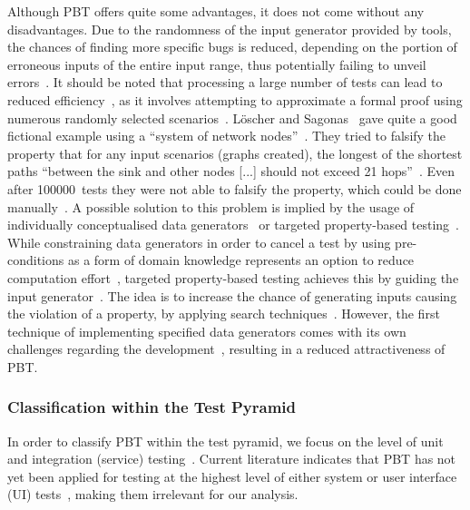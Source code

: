 \documentclass[runningheads]{llncs}
\begin{document}
Although PBT offers quite some advantages, it does not come without any disadvantages. Due to the randomness of the input generator provided by tools, the chances of finding more specific bugs is reduced, depending on the portion of erroneous inputs of the entire input range, thus potentially failing to unveil errors~\cite{Loescher2017,Padhye2019,ElazarMittelman2023,Shi2023}. It should be noted that processing a large number of tests can lead to reduced efficiency~\cite{ElazarMittelman2023,Shi2023}, as it involves attempting to approximate a formal proof using numerous randomly selected scenarios~\cite{Fink1997,ElazarMittelman2023,Paraskevopoulou2015}. Löscher and Sagonas~\cite{Loescher2017} gave quite a good fictional example using a ``system of network nodes''~\cite{Loescher2017}. They tried to falsify the property that for any input scenarios (graphs created), the longest of the shortest paths ``between the sink and other nodes [...] should not exceed 21 hops''~\cite{Loescher2017}. Even after 100000~tests they were not able to falsify the property, which could be done manually~\cite{Loescher2017}. A possible solution to this problem is implied by the usage of individually conceptualised data generators~\cite{Loescher2017,ElazarMittelman2023,Shi2023,Paraskevopoulou2015,Claessen2000} or targeted property-based testing~\cite{Loescher2017}. While constraining data generators in order to cancel a test by using pre-conditions as a form of domain knowledge represents an option to reduce computation effort~\cite{Loescher2017,ElazarMittelman2023,Shi2023}, targeted property-based testing achieves this by guiding the input generator~\cite{Loescher2017}. The idea is to increase the chance of generating inputs causing the violation of a property, by applying search techniques~\cite{Loescher2017}. However, the first technique of implementing specified data generators comes with its own challenges regarding the development~\cite{Loescher2017,ElazarMittelman2023,Shi2023}, resulting in a reduced attractiveness of PBT.

\subsubsection{Classification within the Test Pyramid}
In order to classify PBT within the test pyramid, we focus on the level of unit and integration (service) testing~\cite{Aniche2022,Radziwill2020}. Current literature indicates that PBT has not yet been applied for testing at the highest level of either system or user interface (UI) tests~\cite{Radziwill2020,Aniche2022}, making them irrelevant for our analysis.
\end{document}
